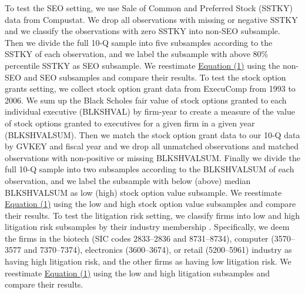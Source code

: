 \documentclass[letterpaper,11pt]{article}
\begin{document}
\begin{spacing}{1.5}
To test the SEO setting, we use Sale of Common and Preferred Stock (SSTKY) data from Compustat. We drop all observations with missing or negative SSTKY and we classify the observations with zero SSTKY into non-SEO subsample. Then we divide the full 10-Q sample into five subsamples according to the SSTKY of each observation, and we label the subsample with above 80\% percentile SSTKY as SEO subsample. We reestimate \hyperref[eq1]{Equation (1)} using the non-SEO and SEO subsamples and compare their results. To test the stock option grants setting, we collect stock option grant data from ExecuComp from 1993 to 2006. We sum up the Black Scholes fair value of stock options granted to each individual executive (BLKSHVAL) by firm-year to create a measure of the value of stock options granted to executives for a given firm in a given year (BLKSHVALSUM). Then we match the stock option grant data to our 10-Q data by GVKEY and fiscal year and we drop all unmatched observations and matched observations with non-positive or missing BLKSHVALSUM. Finally we divide the full 10-Q sample into two subsamples according to the BLKSHVALSUM of each observation, and we label the subsample with below (above) median BLKSHVALSUM as low (high) stock option value subsample. We reestimate \hyperref[eq1]{Equation (1)} using the low and high stock option value subsamples and compare their results. To test the litigation risk setting, we classify firms into low and high litigation risk subsamples by their industry membership \cite{francisShareholderLitigationCorporate1994,kimMeasuringSecuritiesLitigation2012}. Specifically, we deem the firms in the biotech (SIC codes 2833–2836 and 8731–8734), computer (3570–3577 and 7370–7374), electronics (3600–3674), or retail (5200–5961) industry as having high litigation risk, and the other firms as having low litigation risk. We reestimate \hyperref[eq1]{Equation (1)} using the low and high litigation subsamples and compare their results.


\end{spacing}
\end{document}
